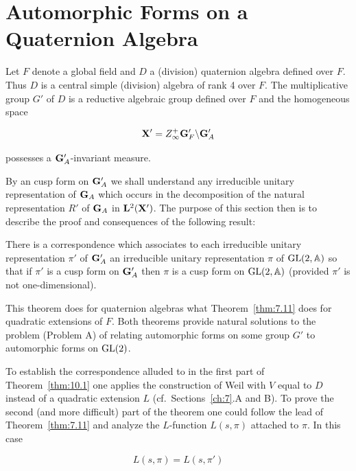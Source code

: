 \chapter{Automorphic Forms on a Quaternion Algebra}

\label{ch:10}

Let $F$ denote a global field and $D$ a (division) quaternion algebra defined over $F$. Thus $D$ is a central simple (division) algebra of rank 4 over $F$. The multiplicative group $G'$ of $D$ is a reductive algebraic group defined over $F$ and the homogeneous space

\[
\mathbf{X}' = Z_\infty^+ \mathbf{G}'_F \backslash \mathbf{G}'_A
\]

possesses a $\mathbf{G}'_A$-invariant measure.

By an cusp form on $\mathbf{G}'_A$ we shall understand any irreducible unitary representation of $\mathbf{G}_A$ which occurs in the decomposition of the natural representation $R'$ of $\mathbf{G}_A$ in $\mathbf{L}^2(\mathbf{X}')$. The purpose of this section then is to describe the proof and consequences of the following result:

\begin{theorem}\label{thm:10.1}

There is a correspondence which associates to each irreducible unitary representation $\pi'$ of $\mathbf{G}'_A$ an irreducible unitary representation $\pi$ of $\operatorname{GL}(2, \mathbb{A})$ so that if $\pi'$ is a cusp form on $\mathbf{G}'_A$ then $\pi$ is a cusp form on $\operatorname{GL}(2, \mathbb{A})$ (provided $\pi'$ is not one-dimensional).

\end{theorem}

This theorem does for quaternion algebras what Theorem~\ref{thm:7.11} does for quadratic extensions of $F$. Both theorems provide natural solutions to the problem (Problem A) of relating automorphic forms on some group $G'$ to automorphic forms on $\operatorname{GL}(2)$.

To establish the correspondence alluded to in the first part of Theorem~\ref{thm:10.1} one applies the construction of Weil with $V$ equal to $D$ instead of a quadratic extension $L$ (cf.\ Sections~\ref{ch:7}.A and B). To prove the second (and more difficult) part of the theorem one could follow the lead of Theorem~\ref{thm:7.11} and analyze the $L$-function $L(s, \pi)$ attached to $\pi$. In this case

\begin{equation}\label{eq:10.1}
L(s, \pi) = L(s, \pi')\tag{10.1}
\end{equation}

